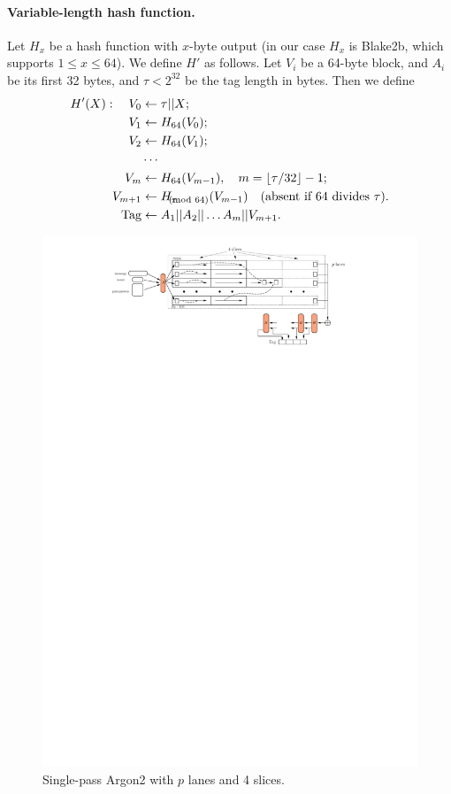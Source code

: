 \documentclass[a4paper]{article}
\begin{document}
\paragraph{Variable-length hash function.} Let $H_x$ be a hash function with $x$-byte output (in our case $H_x$ is Blake2b, which supports $1\leq x \leq 64$). We define $H'$ as follows. Let $V_i$ be a 64-byte block, and  $A_i$ be its first 32 bytes,
and $\tau<2^{32}$ be the tag length in bytes. 
Then we define
\begin{align*}
H'(X):\quad V_0 &\leftarrow\tau||X;\\
V_1 &\leftarrow H_{64}(V_0);\\
V_2 &\leftarrow H_{64}(V_1);\\
&\cdots\\
V_m & \leftarrow H_{64}(V_{m-1}),\quad m = \lfloor\tau/32\rfloor-1;\\
V_{m+1} &\leftarrow H_{\tau\hspace{-10pt} \pmod{64}}(V_{m-1})\quad \text{(absent if  64 divides }\tau).\\
\text{Tag} & \leftarrow A_1||A_2||\ldots A_m||V_{m+1}.
\end{align*}

 \begin{figure}[ht]
  \ifpdf
\begin{center}
  \includegraphics[scale=0.3]{pics/argon2-par.pdf}
  \caption{Single-pass \textsf{Argon2} with $p$ lanes and 4 slices. }\label{fig:argon2}
\end{center}
\fi
  \end{figure}
\end{document}
